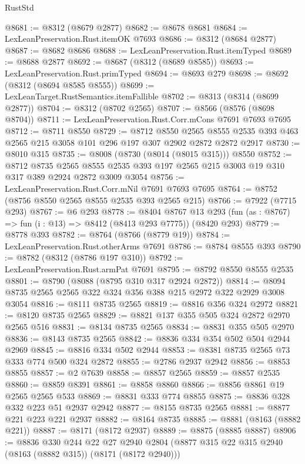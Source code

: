 \begin{lexlean}{RustStd}
\begin{coremodule}
@8681 := @8312 (@8679 @2877)
@8682 := @8678 @8681
@8684 := LexLeanPreservation.Rust.itemOK @7693
@8686 := @8312 (@8684 @2877)
@8687 := @8682 @8686
@8688 := LexLeanPreservation.Rust.itemTyped
@8689 := @8688 @2877
@8692 := @8687 (@8312 (@8689 @8585))
@8693 := LexLeanPreservation.Rust.primTyped
@8694 := @8693 @279
@8698 := @8692 (@8312 (@8694 @8585 @8555))
@8699 := LexLeanTarget.RustSemantics.itemFallible
@8702 := @8313 (@8314 (@8699 @2877))
@8704 := @8312 (@8702 @2565)
@8707 := @8566 (@8576 (@8698 @8704))
@8711 := LexLeanPreservation.Rust.Corr.mCons @7691 @7693 @7695
@8712 := @8711 @8550
@8729 := @8712
    @8550
    @2565
    @8555
    @2535
    @393
    @463
    @2565
    @215
    @3058
    @101
    @296
    @197
    @307
    @2902
    @2872
    @2872
    @2917
@8730 := @8010 @315
@8735 := @8008 (@8730 (@8014 (@8015 @315))) @8550
@8752 := @8712
    @8735
    @2565
    @8555
    @2535
    @393
    @197
    @2565
    @215
    @3003
    @19
    @310
    @317
    @389
    @2924
    @2872
    @3009
    @3054
@8756 := LexLeanPreservation.Rust.Corr.mNil @7691 @7693 @7695
@8764 := @8752 (@8756 @8550 @2565 @8555 @2535 @393 @2565 @215)
@8766 := @7922 (@7715 @293)
@8767 := @6 @293
@8778 := @8404
    @8767
    @13
    @293
    (fun (as : @8767) => fun (i : @13) => @8412 (@8413 @293 @7775))
    (@8420 @293)
@8779 := @8778 @393
@8782 := @8764 (@8766 (@8779 @19))
@8784 := LexLeanPreservation.Rust.otherArms @7691
@8786 := @8784 @8555 @393
@8790 := @8782 (@8312 (@8786 @197 @310))
@8792 := LexLeanPreservation.Rust.armPat @7691
@8795 := @8792 @8550 @8555 @2535
@8801 := @8790 (@8088 (@8795 @310 @317 @2924 @2872))
@8814 := @8094 @8735 @2565 @2565 @322 @324 @356 @388 @215 @2972 @322 @2929 @3008 @3054
@8816 := @8111 @8735 @2565
@8819 := @8816 @356 @324 @2972
@8821 := @8120 @8735 @2565
@8829 := @8821 @137 @355 @505 @324 @2872 @2970 @2565 @516
@8831 := @8134 @8735 @2565
@8834 := @8831 @355 @505 @2970
@8836 := @8143 @8735 @2565
@8842 := @8836 @334 @354 @502 @504 @2944 @2969
@8845 := @8816 @334 @502 @2944
@8853 := @8381 @8735 @2565 @73 @333 @774 @500 @324 @2872
@8855 := @2786 @2937 @2942
@8856 := @8853 @8855
@8857 := @2 @7639
@8858 := @8857 @2565
@8859 := @8857 @2535
@8860 := @8859 @8391
@8861 := @8858 @8860
@8866 := @8856 @8861 @19 @2565 @2565 @533
@8869 := @8831 @333 @774 @8855
@8875 := @8836 @328 @332 @223 @51 @2937 @2942
@8877 := @8155 @8735 @2565
@8881 := @8877 @221 @223 @221 @2937
@8882 := @8164 @8735
@8885 := @8881 (@8163 (@8882 @221))
@8887 := @8171 (@8172 @2937)
@8889 := @8875 (@8885 @8887)
@8906 := @8836
    @330
    @244
    @22
    @27
    @2940
    @2804
    (@8877 @315 @22 @315 @2940 (@8163 (@8882 @315)) (@8171 (@8172 @2940)))

\end{coremodule}
\end{lexlean}
